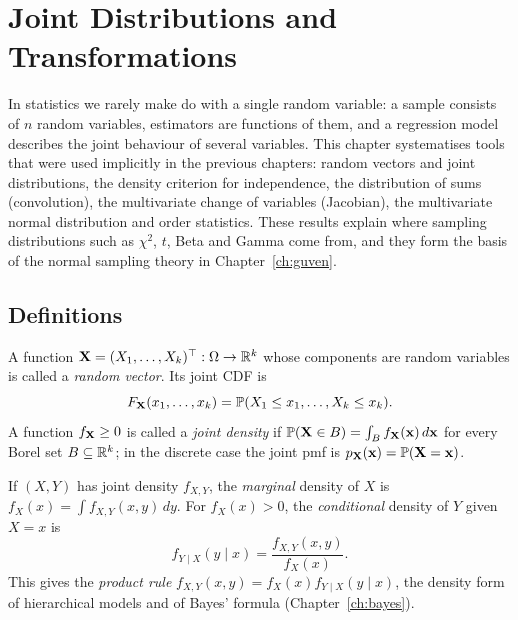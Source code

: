 \documentclass[main.tex]{subfiles}
\begin{document}
\chapter{Joint Distributions and Transformations}\label{ch:ortak}

In statistics we rarely make do with a single random variable: a sample consists of $n$ random variables, estimators are functions of them, and a regression model describes the joint behaviour of several variables. This chapter systematises tools that were used implicitly in the previous chapters: random vectors and joint distributions, the density criterion for independence, the distribution of sums (convolution), the multivariate change of variables (Jacobian), the multivariate normal distribution and order statistics. These results explain where sampling distributions such as $\chi^2$, $t$, Beta and Gamma come from, and they form the basis of the normal sampling theory in Chapter~\ref{ch:guven}.

\section{Definitions}

\begin{definition}
A function $\mathbf{X}=(X_1,\dots,X_k)^\top:\Omega\to\mathbb{R}^k$ whose components are random variables is called a \emph{random vector}. Its joint CDF is
\[
F_{\mathbf{X}}(x_1,\dots,x_k)=\mathbb{P}(X_1\le x_1,\dots,X_k\le x_k).
\]
A function $f_{\mathbf{X}}\ge0$ is called a \emph{joint density} if $\mathbb{P}(\mathbf{X}\in B)=\int_Bf_{\mathbf{X}}(\mathbf{x})\,d\mathbf{x}$ for every Borel set $B\subseteq\mathbb{R}^k$; in the discrete case the joint pmf is $p_{\mathbf{X}}(\mathbf{x})=\mathbb{P}(\mathbf{X}=\mathbf{x})$.
\end{definition}

\begin{definition}
If $(X,Y)$ has joint density $f_{X,Y}$, the \emph{marginal} density of $X$ is $f_X(x)=\int f_{X,Y}(x,y)\,dy$. For $f_X(x)>0$, the \emph{conditional} density of $Y$ given $X=x$ is
\[
f_{Y\mid X}(y\mid x)=\frac{f_{X,Y}(x,y)}{f_X(x)} .
\]
This gives the \emph{product rule} $f_{X,Y}(x,y)=f_X(x)f_{Y\mid X}(y\mid x)$, the density form of hierarchical models and of Bayes' formula (Chapter~\ref{ch:bayes}).
\end{definition}
\end{document}
